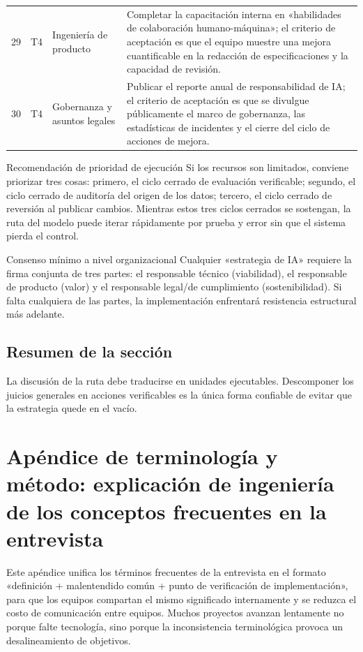 \documentclass[a4paper]{article}
\begin{document}
\begin{longtable}{p{}p{}p{}p{}}
29 & T4 & Ingeniería de producto & Completar la capacitación interna en «habilidades de colaboración humano-máquina»; el criterio de aceptación es que el equipo muestre una mejora cuantificable en la redacción de especificaciones y la capacidad de revisión. \\
30 & T4 & Gobernanza y asuntos legales & Publicar el reporte anual de responsabilidad de IA; el criterio de aceptación es que se divulgue públicamente el marco de gobernanza, las estadísticas de incidentes y el cierre del ciclo de acciones de mejora. \\
\bottomrule
\end{longtable}

\begin{importantbox}{Recomendación de prioridad de ejecución}
Si los recursos son limitados, conviene priorizar tres cosas: primero, el ciclo cerrado de evaluación verificable; segundo, el ciclo cerrado de auditoría del origen de los datos; tercero, el ciclo cerrado de reversión al publicar cambios. Mientras estos tres ciclos cerrados se sostengan, la ruta del modelo puede iterar rápidamente por prueba y error sin que el sistema pierda el control.
\end{importantbox}

\begin{knowledgebox}{Consenso mínimo a nivel organizacional}
Cualquier «estrategia de IA» requiere la firma conjunta de tres partes: el responsable técnico (viabilidad), el responsable de producto (valor) y el responsable legal/de cumplimiento (sostenibilidad). Si falta cualquiera de las partes, la implementación enfrentará resistencia estructural más adelante.
\end{knowledgebox}

\subsection{Resumen de la sección}

La discusión de la ruta debe traducirse en unidades ejecutables. Descomponer los juicios generales en acciones verificables es la única forma confiable de evitar que la estrategia quede en el vacío.

\section{Apéndice de terminología y método: explicación de ingeniería de los conceptos frecuentes en la entrevista}

Este apéndice unifica los términos frecuentes de la entrevista en el formato «definición + malentendido común + punto de verificación de implementación», para que los equipos compartan el mismo significado internamente y se reduzca el costo de comunicación entre equipos. Muchos proyectos avanzan lentamente no porque falte tecnología, sino porque la inconsistencia terminológica provoca un desalineamiento de objetivos.
\end{document}
